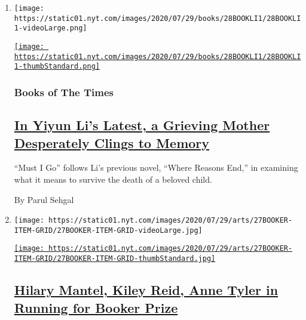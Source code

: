 \begin{enumerate}
\def\labelenumi{\arabic{enumi}.}
\item
  \texttt{[image: https://static01.nyt.com/images/2020/07/29/books/28BOOKLI1/28BOOKLI1-videoLarge.png]}

  \href{/2020/07/28/books/review-must-i-go-yiyun-li.html}{\texttt{[image: https://static01.nyt.com/images/2020/07/29/books/28BOOKLI1/28BOOKLI1-thumbStandard.png]}}

  \hypertarget{books-of-the-times}{%
  \subsubsection{Books of The Times}\label{books-of-the-times}}

  \hypertarget{in-yiyun-lis-latest-a-grieving-mother-desperately-clings-to-memory}{%
  \subsection{\texorpdfstring{\href{/2020/07/28/books/review-must-i-go-yiyun-li.html}{In
  Yiyun Li's Latest, a Grieving Mother Desperately Clings to
  Memory}}{In Yiyun Li's Latest, a Grieving Mother Desperately Clings to Memory}}\label{in-yiyun-lis-latest-a-grieving-mother-desperately-clings-to-memory}}

  ``Must I Go'' follows Li's previous novel, ``Where Reasons End,'' in
  examining what it means to survive the death of a beloved child.

  By Parul Sehgal
\item
  \texttt{[image: https://static01.nyt.com/images/2020/07/29/arts/27BOOKER-ITEM-GRID/27BOOKER-ITEM-GRID-videoLarge.jpg]}

  \href{/2020/07/27/books/hilary-mantel-booker-prize-longlist.html}{\texttt{[image: https://static01.nyt.com/images/2020/07/29/arts/27BOOKER-ITEM-GRID/27BOOKER-ITEM-GRID-thumbStandard.jpg]}}

  \hypertarget{hilary-mantel-kiley-reid-anne-tyler-in-running-for-booker-prize}{%
  \subsection{\texorpdfstring{\href{/2020/07/27/books/hilary-mantel-booker-prize-longlist.html}{Hilary
  Mantel, Kiley Reid, Anne Tyler in Running for Booker
  Prize}}{Hilary Mantel, Kiley Reid, Anne Tyler in Running for Booker Prize}}\label{hilary-mantel-kiley-reid-anne-tyler-in-running-for-booker-prize}}


\end{enumerate}
